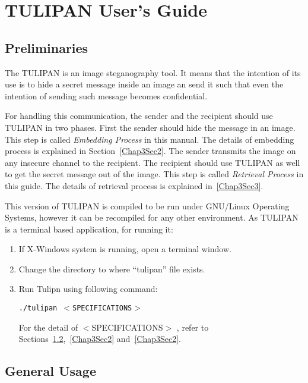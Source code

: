 \chapter{TULIPAN User's Guide}
\begin{flushright}\end{flushright}

\section{Preliminaries}

The TULIPAN is an image steganography tool. It means that the intention of its use is to hide a secret message inside an image an send it such that even the intention of sending such message becomes confidential. 

For handling this communication, the sender and the recipient should use TULIPAN in two phases. First the sender should hide the message in an image. This step is called {\it Embedding Process} in this manual. The details of embedding process is explained in Section~\ref{Chap3Sec2}. The sender transmits the image on any insecure channel to the recipient. The recipient should use TULIPAN as well to get the secret message out of the image. This step is called {\it Retrieval Process} in this guide. The details of retrieval process is explained in~\ref{Chap3Sec3}.

This version of TULIPAN is compiled to be run under GNU/Linux Operating Systems, however it can be recompiled for any other environment. As TULIPAN is a terminal based application, for running it:

\begin{enumerate}
  \item {If X-Windows system is running, open a terminal window.}
  \item {Change the directory to where ``tulipan'' file exists.}
  \item {Run Tulipn using following command:}

    \texttt{./tulipan $<$SPECIFICATIONS$>$}
    
    For the detail of $<$SPECIFICATIONS$>$ , refer to Sections~\ref{Chap3Sec1.5},~\ref{Chap3Sec2} and~\ref{Chap3Sec2}.
\end{enumerate}

\section{General Usage}
\label{Chap3Sec1.5} 

